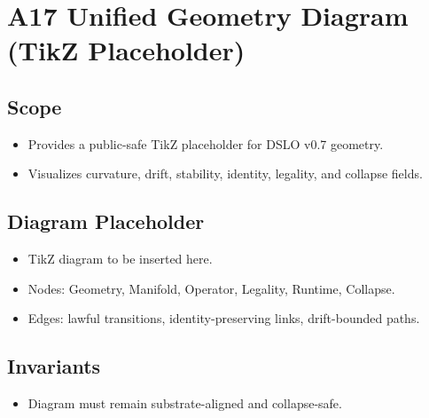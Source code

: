 \section{A17 Unified Geometry Diagram (TikZ Placeholder)}

\subsection{Scope}
\begin{itemize}
    \item Provides a public-safe TikZ placeholder for DSLO v0.7 geometry.
    \item Visualizes curvature, drift, stability, identity, legality, and collapse fields.
\end{itemize}

\subsection{Diagram Placeholder}
\begin{itemize}
    \item TikZ diagram to be inserted here.
    \item Nodes: Geometry, Manifold, Operator, Legality, Runtime, Collapse.
    \item Edges: lawful transitions, identity-preserving links, drift-bounded paths.
\end{itemize}

\subsection{Invariants}
\begin{itemize}
    \item Diagram must remain substrate-aligned and collapse-safe.
\end{itemize}
